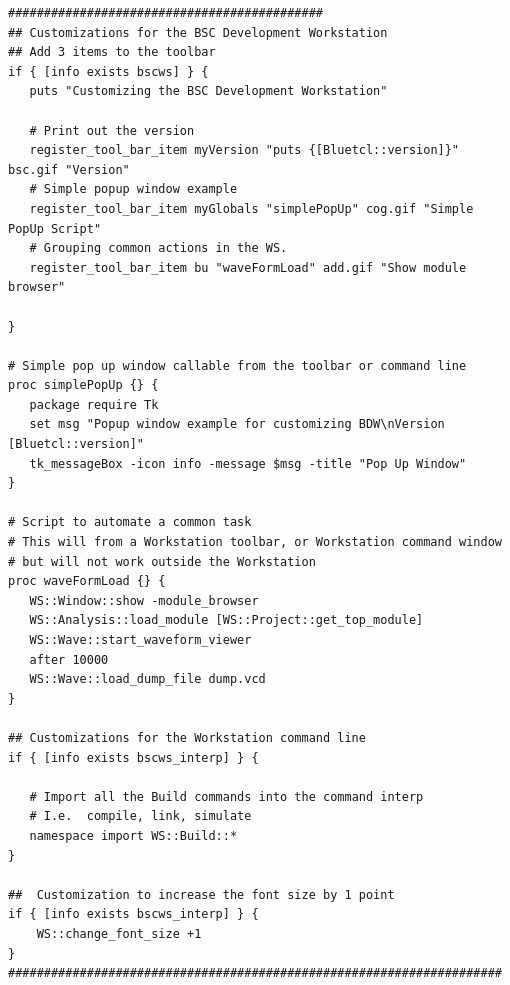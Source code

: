 \begin{verbatim} 
############################################
## Customizations for the BSC Development Workstation
## Add 3 items to the toolbar
if { [info exists bscws] } {
   puts "Customizing the BSC Development Workstation"

   # Print out the version
   register_tool_bar_item myVersion "puts {[Bluetcl::version]}" bsc.gif "Version"
   # Simple popup window example
   register_tool_bar_item myGlobals "simplePopUp" cog.gif "Simple PopUp Script"
   # Grouping common actions in the WS.
   register_tool_bar_item bu "waveFormLoad" add.gif "Show module browser"

}

# Simple pop up window callable from the toolbar or command line
proc simplePopUp {} {
   package require Tk
   set msg "Popup window example for customizing BDW\nVersion
[Bluetcl::version]"
   tk_messageBox -icon info -message $msg -title "Pop Up Window"
}

# Script to automate a common task
# This will from a Workstation toolbar, or Workstation command window
# but will not work outside the Workstation
proc waveFormLoad {} {
   WS::Window::show -module_browser
   WS::Analysis::load_module [WS::Project::get_top_module]
   WS::Wave::start_waveform_viewer
   after 10000
   WS::Wave::load_dump_file dump.vcd
}

## Customizations for the Workstation command line
if { [info exists bscws_interp] } {

   # Import all the Build commands into the command interp
   # I.e.  compile, link, simulate
   namespace import WS::Build::*
}

##  Customization to increase the font size by 1 point
if { [info exists bscws_interp] } {
    WS::change_font_size +1
}
#####################################################################
\end{verbatim}

